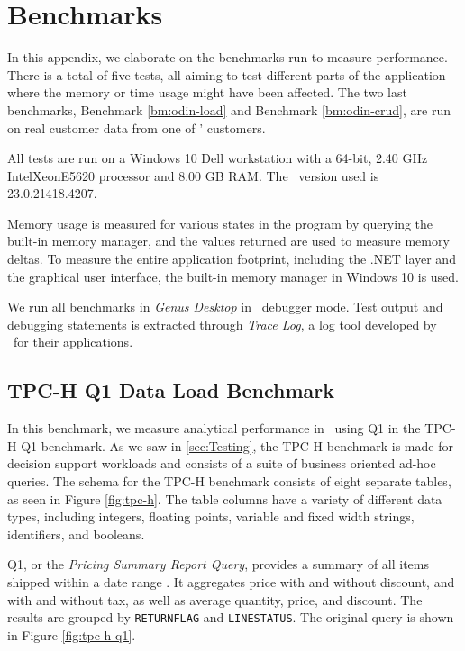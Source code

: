 \chapter{Benchmarks}
\label{app:Benchmarks}
In this appendix, we elaborate on the benchmarks run to measure performance. There is a total of five tests, all aiming to test different parts of the application where the memory or time usage might have been affected. The two last benchmarks, Benchmark \ref{bm:odin-load} and Benchmark \ref{bm:odin-crud}, are run on real customer data from one of \genus' customers.

All tests are run on a Windows 10 Dell workstation with a 64-bit, 2.40 GHz Intel\textregistered Xeon\textregistered E5620 processor and 8.00 GB RAM. The \delphi~version used is 23.0.21418.4207. 

Memory usage is measured for various states in the program by querying the built-in  memory manager, and the values returned are used to measure memory deltas. To measure the entire application footprint, including the .NET layer and the graphical user interface, the built-in memory manager in Windows 10 is used.

We run all benchmarks in \textit{Genus Desktop} in \delphi~debugger mode. Test output and debugging statements is extracted through \textit{Trace Log}, a log tool developed by \genus~for their applications.

\section{TPC-H Q1 Data Load Benchmark}
\label{bm:q1}
In this benchmark, we measure analytical performance in \gap~using Q1 in the TPC-H Q1 benchmark. As we saw in \ref{sec:Testing}, the TPC-H benchmark is made for decision support workloads and consists of a suite of business oriented ad-hoc queries. The schema for the TPC-H benchmark consists of eight separate tables, as seen in Figure \ref{fig:tpc-h}. The table columns have a variety of different data types, including integers, floating points, variable and fixed width strings, identifiers, and booleans. 

Q1, or the \textit{Pricing Summary Report Query}, provides a summary of all items shipped within a date range \cite{Transaction_Processing_Performance_Council_TPC2014-ux}. It aggregates price with and without discount, and with and without tax, as well as average quantity, price, and discount. The results are grouped by \texttt{RETURNFLAG} and \texttt{LINESTATUS}. The original query is shown in Figure \ref{fig:tpc-h-q1}.

